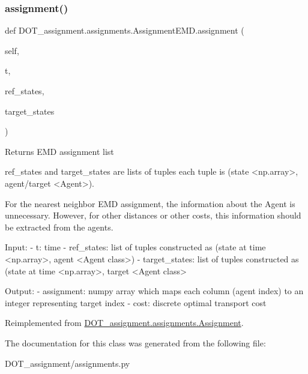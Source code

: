 \subsubsection{\texorpdfstring{assignment()}{assignment()}}
{\footnotesize\ttfamily def D\+O\+T\+\_\+assignment.\+assignments.\+Assignment\+E\+M\+D.\+assignment (\begin{DoxyParamCaption}\item[{}]{self,  }\item[{}]{t,  }\item[{}]{ref\+\_\+states,  }\item[{}]{target\+\_\+states }\end{DoxyParamCaption})}

\begin{DoxyVerb}Returns EMD assignment list

ref_states and target_states are lists of tuples
each tuple is (state <np.array>, agent/target <Agent>).

For the nearest neighbor EMD assignment, the information
about the Agent is unnecessary. However, for other distances
or other costs, this information should be extracted
from the agents.

Input:
- t:                    time
- ref_states:           list of tuples constructed as (state at time <np.array>, agent <Agent class>)
- target_states:        list of tuples constructed as (state at time <np.array>, target <Agent class>

Output:
- assignment:           numpy array which maps each column (agent index) to an integer representing target index
- cost:                 discrete optimal transport cost\end{DoxyVerb}
 

Reimplemented from \mbox{\hyperlink{class_d_o_t__assignment_1_1assignments_1_1_assignment}{D\+O\+T\+\_\+assignment.\+assignments.\+Assignment}}.



The documentation for this class was generated from the following file\+:\begin{DoxyCompactItemize}
\item 
D\+O\+T\+\_\+assignment/assignments.\+py\end{DoxyCompactItemize}
